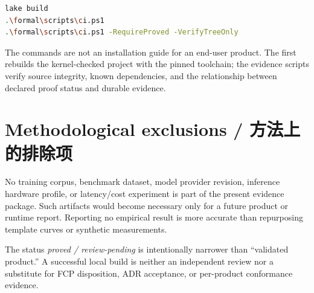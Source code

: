 \begin{MWCodeBox}
\begin{lstlisting}[style=moonweave,language=bash]
lake build
.\formal\scripts\ci.ps1
.\formal\scripts\ci.ps1 -RequireProved -VerifyTreeOnly
\end{lstlisting}
\end{MWCodeBox}

The commands are not an installation guide for an end-user product. The first rebuilds the
kernel-checked project with the pinned toolchain; the evidence scripts verify source integrity,
known dependencies, and the relationship between declared proof status and durable evidence.

\section{Methodological exclusions / 方法上的排除项}

No training corpus, benchmark dataset, model provider revision, inference hardware profile, or
latency/cost experiment is part of the present evidence package. Such artifacts would become
necessary only for a future product or runtime report. Reporting no empirical result is more
accurate than repurposing template curves or synthetic measurements.

\begin{MWRisk}
The status \emph{proved / review-pending} is intentionally narrower than “validated product.”
A successful local build is neither an independent review nor a substitute for FCP disposition,
ADR acceptance, or per-product conformance evidence.
\end{MWRisk}
